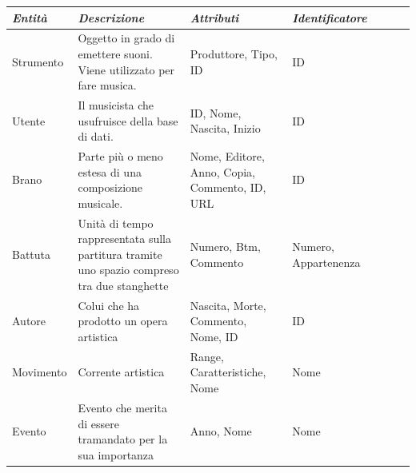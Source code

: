 \documentclass{article}
\begin{document}
    \begin{tabular}{l p{5cm} p{3cm} p{2cm} l l l}
        \toprule
        \textbf{\textit{Entità}} & \textbf{\textit{Descrizione}} & \textbf{\textit{Attributi}} & \textbf{\textit{Identificatore}} \\
        \midrule
        Strumento & Oggetto in grado di emettere suoni. Viene utilizzato per fare musica. & Produttore, \newline Tipo, \newline ID & ID \\
        \midrule
        Utente & Il musicista che usufruisce della base di dati. & ID, \newline Nome, \newline Nascita, \newline Inizio & ID \\
        \midrule
        Brano & Parte più o meno estesa di una composizione musicale. & Nome, \newline Editore, \newline Anno, \newline Copia, \newline Commento, \newline ID, \newline URL & ID \\
        \midrule
        Battuta & Unità di tempo rappresentata sulla partitura tramite uno spazio compreso tra due stanghette & Numero, \newline Btm, \newline Commento & Numero, \newline Appartenenza \\
        \midrule
        Autore & Colui che ha prodotto un opera artistica & Nascita, \newline Morte, \newline Commento,  \newline Nome, \newline ID & ID \\
        \midrule
        Movimento & Corrente artistica & Range, \newline Caratteristiche, \newline Nome & Nome \\
        \midrule
        Evento & Evento che merita di essere tramandato per la sua importanza & Anno, \newline Nome & Nome \\
        \bottomrule
    \end{tabular}
\end{document}
